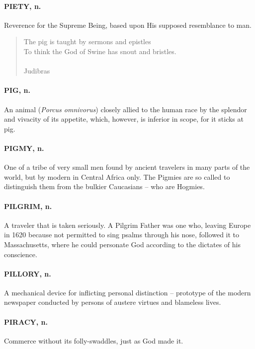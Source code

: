 \documentclass[11pt]{article}
\begin{document}
\paragraph{PIETY, n.}  Reverence for the Supreme Being, based upon His supposed
resemblance to man.

\begin{quote}   The pig is taught by sermons and epistles \\
  To think the God of Swine has snout and bristles. \\
 \\
Judibras \end{quote}


\paragraph{PIG, n.}  An animal ({\em Porcus omnivorus}) closely allied to the human
race by the splendor and vivacity of its appetite, which, however, is
inferior in scope, for it sticks at pig.

\paragraph{PIGMY, n.}  One of a tribe of very small men found by ancient travelers
in many parts of the world, but by modern in Central Africa only.  The
Pigmies are so called to distinguish them from the bulkier Caucasians
-- who are Hogmies.

\paragraph{PILGRIM, n.}  A traveler that is taken seriously.  A Pilgrim Father was
one who, leaving Europe in 1620 because not permitted to sing psalms
through his nose, followed it to Massachusetts, where he could
personate God according to the dictates of his conscience.

\paragraph{PILLORY, n.}  A mechanical device for inflicting personal distinction
-- prototype of the modern newspaper conducted by persons of austere
virtues and blameless lives.

\paragraph{PIRACY, n.}  Commerce without its folly-swaddles, just as God made it.
\end{document}
